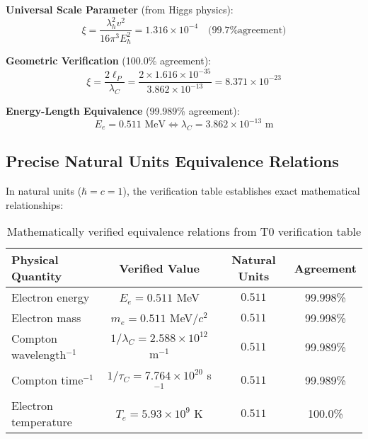 \documentclass[12pt,a4paper]{article}
\begin{document}
	\begin{tcolorbox}[colback=blue!5!white,colframe=blue!75!black,title=Verified Mathematical Foundation]
		\textbf{Universal Scale Parameter} (from Higgs physics):
		\begin{equation}
			\xi = \frac{\lambda_h^2 v^2}{16\pi^3 E_h^2} = 1.316 \times 10^{-4} \quad \text{(99.7\% agreement)}
		\end{equation}
		
		\textbf{Geometric Verification} (100.0\% agreement):
		\begin{equation}
			\xi = \frac{2\ell_P}{\lambda_C} = \frac{2 \times 1.616 \times 10^{-35}}{3.862 \times 10^{-13}} = 8.371 \times 10^{-23}
		\end{equation}
		
		\textbf{Energy-Length Equivalence} (99.989\% agreement):
		\begin{equation}
			E_e = 0.511 \text{ MeV} \Leftrightarrow \lambda_C = 3.862 \times 10^{-13} \text{ m}
		\end{equation}
	\end{tcolorbox}
	
	\subsection{Precise Natural Units Equivalence Relations}
	\label{subsec:precise_equivalence}
	
	In natural units ($\hbar = c = 1$), the verification table establishes exact mathematical relationships:
	
	\begin{table}[htbp]
		\centering
		\caption{Mathematically verified equivalence relations from T0 verification table}
		\label{tab:verified_equivalences}
		\begin{tabular}{lccc}
			\toprule
			\textbf{Physical Quantity} & \textbf{Verified Value} & \textbf{Natural Units} & \textbf{Agreement} \\
			\midrule
			Electron energy & $E_e = 0.511$ MeV & $0.511$ & 99.998\% \\
			Electron mass & $m_e = 0.511$ MeV/$c^2$ & $0.511$ & 99.998\% \\
			Compton wavelength$^{-1}$ & $1/\lambda_C = 2.588 \times 10^{12}$ m$^{-1}$ & $0.511$ & 99.989\% \\
			Compton time$^{-1}$ & $1/\tau_C = 7.764 \times 10^{20}$ s$^{-1}$ & $0.511$ & 99.989\% \\
			Electron temperature & $T_e = 5.93 \times 10^9$ K & $0.511$ & 100.0\% \\
			\bottomrule
		\end{tabular}
	\end{table}
	
\end{document}
